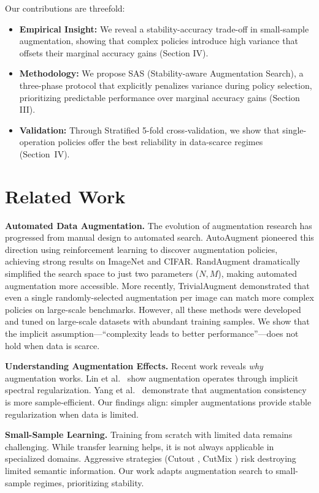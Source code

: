 \documentclass[conference,letterpaper]{IEEEtran}
\begin{document}
Our contributions are threefold:
\begin{itemize}
    \item \textbf{Empirical Insight:} We reveal a stability-accuracy trade-off in small-sample augmentation, showing that complex policies introduce high variance that offsets their marginal accuracy gains (Section IV).
    \item \textbf{Methodology:} We propose SAS (Stability-aware Augmentation Search), a three-phase protocol that explicitly penalizes variance during policy selection, prioritizing predictable performance over marginal accuracy gains (Section III).
    \item \textbf{Validation:} Through Stratified 5-fold cross-validation, we show that single-operation policies offer the best reliability in data-scarce regimes (Section~IV).
\end{itemize}

\section{Related Work}

\textbf{Automated Data Augmentation.} The evolution of augmentation research has progressed from manual design to automated search. AutoAugment \cite{cubuk2019autoaugment} pioneered this direction using reinforcement learning to discover augmentation policies, achieving strong results on ImageNet and CIFAR. RandAugment \cite{cubuk2020randaugment} dramatically simplified the search space to just two parameters ($N, M$), making automated augmentation more accessible. More recently, TrivialAugment \cite{muller2021trivialaugment} demonstrated that even a single randomly-selected augmentation per image can match more complex policies on large-scale benchmarks. However, all these methods were developed and tuned on large-scale datasets with abundant training samples. We show that the implicit assumption---``complexity leads to better performance''---does not hold when data is scarce.

\textbf{Understanding Augmentation Effects.} Recent work reveals \textit{why} augmentation works. Lin et al.~\cite{lin2024spectral} show augmentation operates through implicit spectral regularization. Yang et al.~\cite{yang2023sample} demonstrate that augmentation consistency is more sample-efficient. Our findings align: simpler augmentations provide stable regularization when data is limited.

\textbf{Small-Sample Learning.} Training from scratch with limited data remains challenging. While transfer learning helps, it is not always applicable in specialized domains. Aggressive strategies (Cutout \cite{devries2017improved}, CutMix \cite{yun2019cutmix}) risk destroying limited semantic information. Our work adapts augmentation search to small-sample regimes, prioritizing stability.
\end{document}
